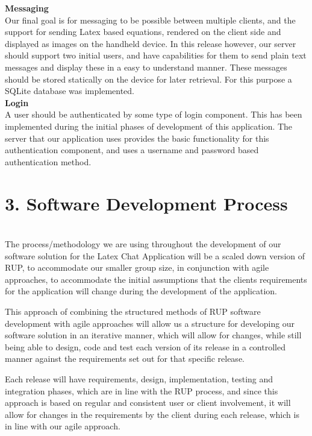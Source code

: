 \documentclass[29pt,a4paper]{moderncv}
\begin{document}
		
		\noindent\textbf{Messaging}
		\\Our final goal is for messaging to be possible between multiple clients, and the support for sending Latex based equations, rendered on the client side and displayed as images on the handheld device. In this release however, our server should support two initial users, and have capabilities for them to send plain text messages and display these in a easy to understand manner.  These messages should be stored statically on the device for later retrieval.  For this purpose a SQLite database was implemented.\\
		
		\noindent\textbf{Login}
		\\A user should be authenticated by some type of login component.  This has been implemented during the initial phases of development of this application.  The server that our application uses provides the basic functionality for this authentication component, and uses a username and password based authentication method.
		
\newpage
	\section*{3. Software Development Process}
	\vspace{4mm}
	\\The process/methodology we are using throughout the development of our software solution for the Latex Chat Application will be a scaled down version of RUP, to accommodate our smaller group size, in conjunction with agile approaches, to accommodate the initial assumptions that the clients requirements for the application will change during the development of the application.
	
	This approach of combining the structured methods of RUP software development with agile approaches will allow us a structure for developing our software solution in an iterative manner, which will allow for changes, while still being able to design, code and test each version of its release in a controlled manner against the requirements set out for that specific release.
	
	Each release will have requirements, design, implementation, testing and integration phases, which are in line with the RUP process, and since this approach is based on regular and consistent user or client involvement, it will allow for changes in the requirements by the client during each release, which is in line with our agile approach.
	
\end{document}
